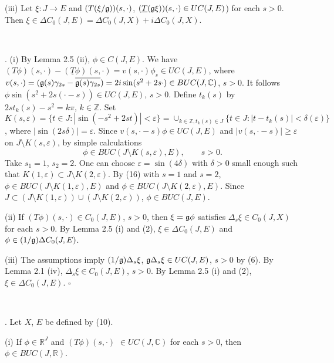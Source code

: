 \documentclass[10pt,onside,reqno]{amsart}
\newcommand{\Cdb}{\mbox{$\mathbb{C}$}}
\newcommand{\Rdb}{\mbox{$\mathbb{R}$}}
\newcommand{\Zdb}{\mbox{$\mathbb{Z}$}}
\theoremstyle{remark}
\theoremstyle{definition}
\begin{document}
(iii) Let $\xi : J\to E$  and $(T(\xi/\frak{g})
)(s,
 \cdot)$,   $(\underline{T}(\frak{g}\xi))(s,\cdot)\in UC (J,E)$) for each $s > 0$. Then $\xi\in  \Delta C_0(J,E)= \Delta C_0(J,X)+i  \Delta C_0(J,X)$.

\

. (i) By Lemma 2.5 (ii), $\phi\in C(J,E)$.  We have $(T\phi)(s,\cdot)-(\underline{T}\phi)(s,\cdot)=
v(s,\cdot)\phi_s \in  UC(J,E)$, where $v(s,\cdot)=(\frak{g}(s)\gamma_{2s}-\overline{\frak{g}(s)\gamma_{2s}})= 2i\sin (s^2+2s\cdot)\in BUC(J,
\Cdb)$, $s > 0$. It follows $\phi \sin (s^2+2s(\cdot-s)) \in  UC(J,E)$, $ s > 0$.
 Define $t_k (s)$ by $2s t_k(s) -s^2 = k\pi$, $k\in \Zdb$. Set $K(s,\varepsilon)= \{ t\in J: |\sin (-s^2 +2s t)| < \varepsilon\}= \cup_{k\in \Zdb, t_k(s)\in J}\{ t\in J: |t-t_k(s)| < \delta (\varepsilon)\}$, where $|\sin (2s\delta)|=\varepsilon $. Since $v(s,\cdot-s)\phi \in  UC(J,E)$ and $|v(s,\cdot-s)|\ge \varepsilon$ on $J\setminus K(s,\varepsilon)$, by simple calculations
 \begin{equation}
\label{metric}
 \phi \in  BUC(J\setminus K(s,\varepsilon),E),\qquad s > 0.
 \end{equation}
\noindent  Take $s_1=1$, $s_2=2$.
One can choose  $\varepsilon= \sin (4 \delta)  $ with $ \delta >0 $ small enough such that  $ K(1,\varepsilon)\subset J\setminus K(2,\varepsilon)$. By (16) with $s=1$ and $s=2$, $\phi \in  BUC(J\setminus K(1,\varepsilon),E)$ and $\phi \in  BUC(J\setminus K(2,\varepsilon),E)$.  Since $J \subset (J\setminus K(1,\varepsilon)) \cup (J\setminus K(2,\varepsilon)) $, $\phi\in  BUC(J,E)$.



(ii) If $(T\phi)(s,
 \cdot)\in C_0 (J,E)$, $s >0$, then   $\xi= \frak{g}\phi $  satisfies $\Delta_s\xi \in  C_0(J,X)$  for each $s > 0$. By Lemma 2.5 (i) and (2), $\xi\in \Delta C_0(J,E)$ and  $\phi\in (1/\frak{g})\Delta C_0(J,E)$.



(iii) The assumptions imply $(1/\frak{g})\Delta_s\xi$, $ \frak{g}\Delta_s\xi \in  UC (J,E)$, $s > 0$ by (6). By Lemma 2.1 (iv), $\Delta_s \xi \in C_0 (J,E)$, $s > 0$. By Lemma 2.5 (i) and (2),  $\xi\in  \Delta C_0(J,E)$. $\square$


\


. Let  $X$, $E$ be  defined by (10).

 (i) If $\phi \in  \Rdb^J$
and
 $(T\phi)(s,\cdot)$  $\in UC(J,\Cdb)$ for each $s> 0$, then $\phi\in BUC(J,\Rdb)$.
\end{document}
